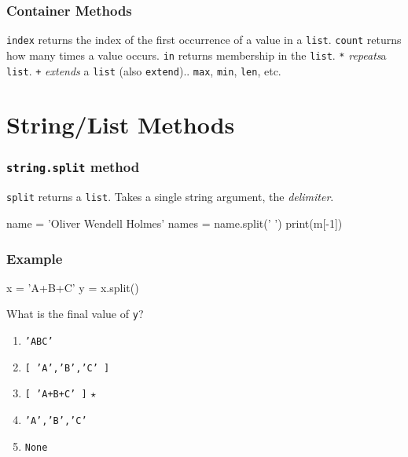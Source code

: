 \documentclass[11pt]{beamer}
\begin{document}
\begin{frame}[fragile]
  \frametitle{Container Methods}
  \Enlarge

  \begin{itemize}
  \myitem  \texttt{index} returns the index of the first occurrence of a value in a \texttt{list}.
  \myitem  \texttt{count} returns how many times a value occurs.
  \myitem  \texttt{in} returns membership in the \texttt{list}.
  \myitem  \texttt{*} \emph{repeats}a \texttt{list}.
  \myitem  \texttt{+} \emph{extends} a \texttt{list} (also \texttt{extend})..
  \myitem  \texttt{max}, \texttt{min}, \texttt{len}, etc.
  \end{itemize}
\end{frame}

\section{String/List Methods}

\begin{frame}[fragile]
  \frametitle{\texttt{string.split} method}
  \Enlarge

  \begin{itemize}
  \myitem  \texttt{split} returns a \texttt{list}. %
  \myitem  Takes a single string argument, the \emph{delimiter}. %
  \end{itemize}
  \begin{semiverbatim}
name = 'Oliver Wendell Holmes'
names = name.split(' ')
print(m[-1])
  \end{semiverbatim}
\end{frame}

\begin{frame}[fragile]
  \frametitle{Example}
  \Enlarge

  \begin{semiverbatim}
x = 'A+B+C'
y = x.split()
  \end{semiverbatim}
  What is the final value of \texttt{y}?
  \begin{enumerate}[label=\Alph*]
  \item  \texttt{'ABC'}
  \item  \texttt{[ 'A','B','C' ]}
  \item  \texttt{[ 'A+B+C' ]}  $\star$
  \item  \texttt{'A','B','C'}
  \item  \texttt{None}
  \end{enumerate}
\end{frame}
\end{document}
